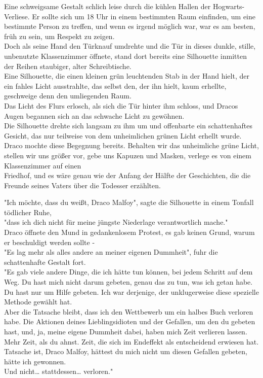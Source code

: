 {Eine schweigsame Gestalt schlich leise durch die kühlen Hallen der Hogwarts-Verliese. Er sollte sich um 18 Uhr in einem bestimmten Raum einfinden, um eine bestimmte Person zu treffen, und wenn es irgend möglich war, war es am besten, früh zu sein, um Respekt zu zeigen.\\ Doch als seine Hand den Türknauf umdrehte und die Tür in dieses dunkle, stille, unbenutzte Klassenzimmer öffnete, stand dort bereits eine Silhouette inmitten der Reihen staubiger, alter Schreibtische.\\ Eine Silhouette, die einen kleinen grün leuchtenden Stab in der Hand hielt, der ein fahles Licht ausstrahlte, das selbst den, der ihn hielt, kaum erhellte, geschweige denn den umliegenden Raum.\\ Das Licht des Flurs erlosch, als sich die Tür hinter ihm schloss, und Dracos Augen begannen sich an das schwache Licht zu gewöhnen.\\ Die Silhouette drehte sich langsam zu ihm um und offenbarte ein schattenhaftes Gesicht, das nur teilweise von dem unheimlichen grünen Licht erhellt wurde.\\ Draco mochte diese Begegnung bereits. Behalten wir das unheimliche grüne Licht, stellen wir uns größer vor, gebe uns Kapuzen und Masken, verlege es von einem Klassenzimmer auf einen\\ Friedhof, und es wäre genau wie der Anfang der Hälfte der Geschichten, die die Freunde seines Vaters über die Todesser erzählten.

"Ich möchte, dass du weißt, Draco Malfoy", sagte die Silhouette in einem Tonfall tödlicher Ruhe,\\ "dass ich dich nicht für meine jüngste Niederlage verantwortlich mache."\\ Draco öffnete den Mund in gedankenlosem Protest, es gab keinen Grund, warum er beschuldigt werden sollte -\\ "Es lag mehr als alles andere an meiner eigenen Dummheit", fuhr die schattenhafte Gestalt fort.\\ "Es gab viele andere Dinge, die ich hätte tun können, bei jedem Schritt auf dem Weg. Du hast mich nicht darum gebeten, genau das zu tun, was ich getan habe.\\ Du hast nur um Hilfe gebeten. Ich war derjenige, der unklugerweise diese spezielle Methode gewählt hat.\\ Aber die Tatsache bleibt, dass ich den Wettbewerb um ein halbes Buch verloren habe. Die Aktionen deines Lieblingsidioten und der Gefallen, um den du gebeten hast, und, ja, meine eigene Dummheit dabei, haben mich Zeit verlieren lassen.\\ Mehr Zeit, als du ahnst. Zeit, die sich im Endeffekt als entscheidend erwiesen hat. Tatsache ist, Draco Malfoy, hättest du mich nicht um diesen Gefallen gebeten, hätte ich gewonnen.\\ Und nicht… stattdessen… verloren."

}
